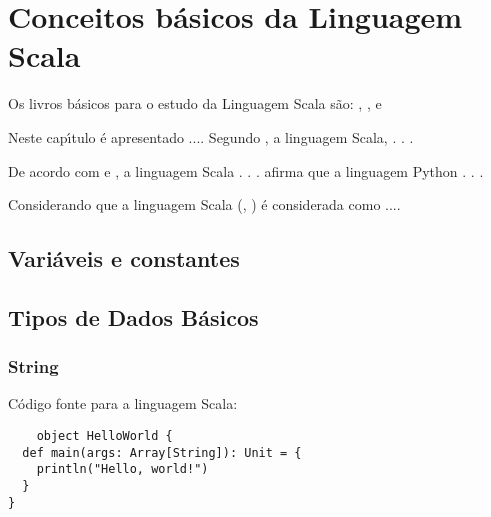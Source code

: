 

\chapter{ Conceitos b\'{a}sicos da Linguagem Scala}

Os livros b\'{a}sicos para o estudo da Linguagem Scala s\~{a}o: \cite{Whaling2020}, \cite{Wampler2021}, \cite{Hunt2018} e \cite{Upadhyaya2019}

Neste cap\'{\i}tulo \'{e} apresentado ....  Segundo \cite{Hunt2018}, a linguagem Scala,  . . .

De acordo com \cite{Sebesta2018} e \cite{roy04}, a linguagem Scala . . . \cite{Sebesta2018} afirma que a linguagem Python . . .

Considerando que a linguagem Scala (\cite{Whaling2020}, \cite{Upadhyaya2019}) \'{e} considerada como ....

    \section{Vari\'{a}veis e constantes}


    \section{Tipos de Dados B\'{a}sicos}

            \subsection{String}

    C\'{o}digo fonte para a linguagem Scala:
    \begin{lstlisting}
    object HelloWorld {
  def main(args: Array[String]): Unit = {
    println("Hello, world!")
  }
}
    \end{lstlisting}

